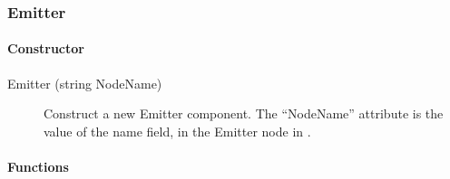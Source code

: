 \subsubsection{Emitter}

\paragraph{Constructor}

\noindent
\begin{description}
\item[{Emitter (string NodeName)}] Construct a new Emitter
  component. The ``NodeName'' attribute is the value of the name
  field, in the Emitter node in \webots.

\end{description}

\paragraph{Functions}

